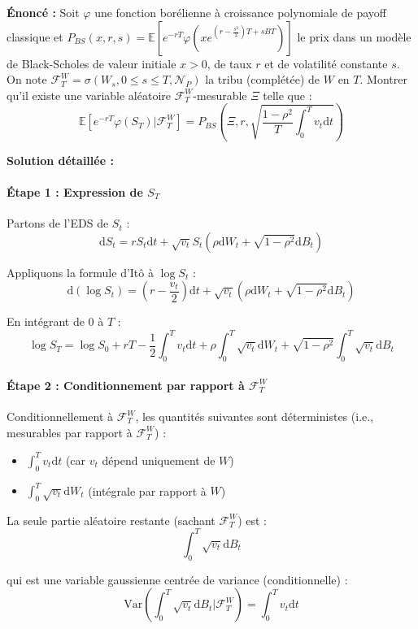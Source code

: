 \documentclass[12pt,a4paper]{article}
\theoremstyle{definition}
\theoremstyle{remark}
\newcommand{\E}{\mathbb{E}}
\newcommand{\Var}{\text{Var}}
\newcommand{\dd}{\mathrm{d}}
\begin{document}
\textbf{Énoncé :} Soit $\varphi$ une fonction borélienne à croissance polynomiale de payoff classique et $P_{BS}(x,r,s) = \E[e^{-rT}\varphi(xe^{(r-\frac{s^2}{2})T + sBT})]$ le prix dans un modèle de Black-Scholes de valeur initiale $x > 0$, de taux $r$ et de volatilité constante $s$. On note $\mathcal{F}_T^W = \sigma(W_s, 0 \leq s \leq T, \mathcal{N}_P)$ la tribu (complétée) de $W$ en $T$. Montrer qu'il existe une variable aléatoire $\mathcal{F}_T^W$-mesurable $\Xi$ telle que :
\[
\E[e^{-rT}\varphi(S_T)|\mathcal{F}_T^W] = P_{BS}\left(\Xi, r, \sqrt{\frac{1-\rho^2}{T}\int_0^T v_t\dd t}\right)
\]

\textbf{Solution détaillée :}

\paragraph{Étape 1 : Expression de $S_T$}

Partons de l'EDS de $S_t$ :
\[
\dd S_t = rS_t\dd t + \sqrt{v_t}S_t(\rho \dd W_t + \sqrt{1-\rho^2}\dd B_t)
\]

Appliquons la formule d'Itô à $\log S_t$ :
\[
\dd(\log S_t) = \left(r - \frac{v_t}{2}\right)\dd t + \sqrt{v_t}(\rho \dd W_t + \sqrt{1-\rho^2}\dd B_t)
\]

En intégrant de $0$ à $T$ :
\[
\log S_T = \log S_0 + rT - \frac{1}{2}\int_0^T v_t\dd t + \rho\int_0^T \sqrt{v_t}\dd W_t + \sqrt{1-\rho^2}\int_0^T \sqrt{v_t}\dd B_t
\]

\paragraph{Étape 2 : Conditionnement par rapport à $\mathcal{F}_T^W$}

Conditionnellement à $\mathcal{F}_T^W$, les quantités suivantes sont déterministes (i.e., mesurables par rapport à $\mathcal{F}_T^W$) :
\begin{itemize}
\item $\int_0^T v_t\dd t$ (car $v_t$ dépend uniquement de $W$)
\item $\int_0^T \sqrt{v_t}\dd W_t$ (intégrale par rapport à $W$)
\end{itemize}

La seule partie aléatoire restante (sachant $\mathcal{F}_T^W$) est :
\[
\int_0^T \sqrt{v_t}\dd B_t
\]

qui est une variable gaussienne centrée de variance (conditionnelle) :
\[
\Var\left(\int_0^T \sqrt{v_t}\dd B_t \Big| \mathcal{F}_T^W\right) = \int_0^T v_t\dd t
\]
\end{document}
